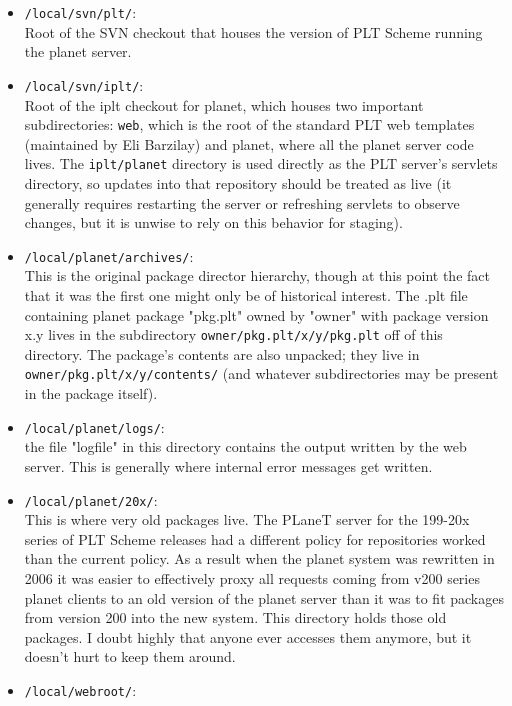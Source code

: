 \documentclass{article}
\begin{document}
\begin{itemize}
\item \texttt{/local/svn/plt/}: \\
Root of the SVN checkout that houses the version of PLT Scheme running
the planet server.

\item \texttt{/local/svn/iplt/}: \\
Root of the iplt checkout for planet, which houses two important
  subdirectories: \texttt{web}, which is the root of the standard PLT web
  templates (maintained by Eli Barzilay) and planet, where all the
  planet server code lives. The \texttt{iplt/planet} directory is used directly
  as the PLT server's servlets directory, so updates into that
  repository should be treated as live (it generally requires
  restarting the server or refreshing servlets to observe changes, but
  it is unwise to rely on this behavior for staging).
\item \texttt{/local/planet/archives/}: \\
This is the original package director hierarchy, though at this point
  the fact that it was the first one might only be of historical
  interest. The .plt file containing planet package "pkg.plt" owned by
  "owner" with package version x.y lives in the subdirectory
  \texttt{owner/pkg.plt/x/y/pkg.plt} off of this directory. The package's
  contents are also unpacked; they live in \texttt{owner/pkg.plt/x/y/contents/}
  (and whatever subdirectories may be present in the package itself).
\item \texttt{/local/planet/logs/}: \\
the file "logfile" in this directory contains the output written by
  the web server. This is generally where internal error messages
  get written.
\item \texttt{/local/planet/20x/}: \\
This is where very old packages live. The PLaneT server for the
  199-20x series of PLT Scheme releases had a different policy for
  repositories worked than the current policy. As a result when the
  planet system was rewritten in 2006 it was easier to effectively
  proxy all requests coming from v200 series planet clients to an old
  version of the planet server than it was to fit packages from
  version 200 into the new system. This directory holds those old
  packages. I doubt highly that anyone ever accesses them anymore, but
  it doesn't hurt to keep them around.
\item \texttt{/local/webroot/}: \\

\end{itemize}
\end{document}

